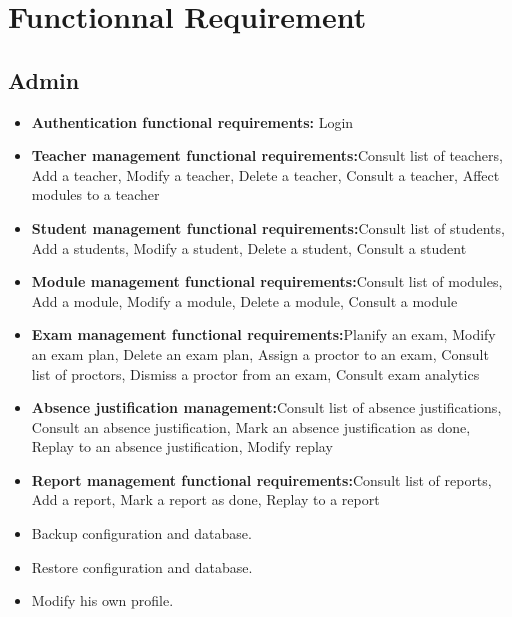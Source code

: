 \documentclass[]{uc2pfecaneva}
\begin{document}
    \raggedright\section{Functionnal Requirement}
    \subsection{Admin}
    \begin{itemize}
        \item{\textbf{Authentication functional requirements:} Login}
        \item{\textbf{Teacher management functional requirements:}Consult list of teachers, Add a teacher, Modify a teacher, Delete a teacher, Consult a teacher, Affect modules to a teacher}
        \item{\textbf{Student management functional requirements:}Consult list of students, Add a students, Modify a student, Delete a student, Consult a student}
        \item{\textbf{Module management functional requirements:}Consult list of modules, Add a module, Modify a module, Delete a module, Consult a module}
        \item{\textbf{Exam management functional requirements:}Planify an exam, Modify an exam plan, Delete an exam plan, Assign a proctor to an exam, Consult list of proctors, Dismiss a proctor from an exam, Consult exam analytics}
        \item{\textbf{Absence justification management:}Consult list of absence justifications, Consult an absence justification, Mark an absence justification as done, Replay to an absence justification, Modify replay}
        \item{\textbf{Report management functional requirements:}Consult list of reports, Add a report, Mark a report as done, Replay to a report}
        \item Backup configuration and database.
        \item Restore configuration and database.
        \item Modify his own profile.
    \end{itemize}
\end{document}
